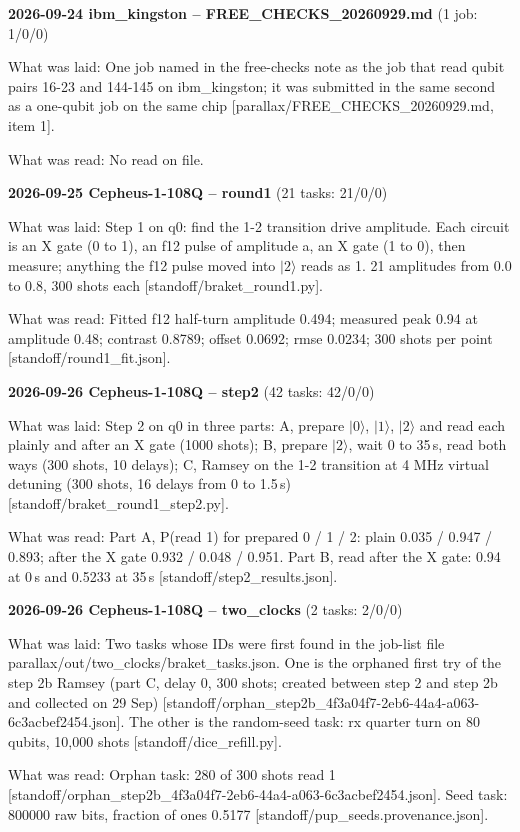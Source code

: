\documentclass[11pt]{article}
\begin{document}
\textbf{2026-09-24 ibm\_kingston -- FREE\_CHECKS\_20260929.md} (1 job: 1/0/0)

What was laid: One job named in the free-checks note as the job that read qubit pairs 16-23 and 144-145 on ibm\_kingston; it was submitted in the same second as a one-qubit job on the same chip {[}parallax/FREE\_CHECKS\_20260929.md, item 1{]}.

What was read: No read on file.

\textbf{2026-09-25 Cepheus-1-108Q -- round1} (21 tasks: 21/0/0)

What was laid: Step 1 on q0: find the 1-2 transition drive amplitude. Each circuit is an X gate (0 to 1), an f12 pulse of amplitude a, an X gate (1 to 0), then measure; anything the f12 pulse moved into \(|2\rangle\) reads as 1. 21 amplitudes from 0.0 to 0.8, 300 shots each {[}standoff/braket\_round1.py{]}.

What was read: Fitted f12 half-turn amplitude 0.494; measured peak 0.94 at amplitude 0.48; contrast 0.8789; offset 0.0692; rmse 0.0234; 300 shots per point {[}standoff/round1\_fit.json{]}.

\textbf{2026-09-26 Cepheus-1-108Q -- step2} (42 tasks: 42/0/0)

What was laid: Step 2 on q0 in three parts: A, prepare \(|0\rangle\), \(|1\rangle\), \(|2\rangle\) and read each plainly and after an X gate (1000 shots); B, prepare \(|2\rangle\), wait 0 to 35\,\textmu s, read both ways (300 shots, 10 delays); C, Ramsey on the 1-2 transition at 4 MHz virtual detuning (300 shots, 16 delays from 0 to 1.5\,\textmu s) {[}standoff/braket\_round1\_step2.py{]}.

What was read: Part A, P(read 1) for prepared 0 / 1 / 2: plain 0.035 / 0.947 / 0.893; after the X gate 0.932 / 0.048 / 0.951. Part B, read after the X gate: 0.94 at 0\,\textmu s and 0.5233 at 35\,\textmu s {[}standoff/step2\_results.json{]}.

\textbf{2026-09-26 Cepheus-1-108Q -- two\_clocks} (2 tasks: 2/0/0)

What was laid: Two tasks whose IDs were first found in the job-list file parallax/out/two\_clocks/braket\_tasks.json. One is the orphaned first try of the step 2b Ramsey (part C, delay 0, 300 shots; created between step 2 and step 2b and collected on 29 Sep) {[}standoff/orphan\_step2b\_4f3a04f7-2eb6-44a4-a063-6c3acbef2454.json{]}. The other is the random-seed task: rx quarter turn on 80 qubits, 10,000 shots {[}standoff/dice\_refill.py{]}.

What was read: Orphan task: 280 of 300 shots read 1 {[}standoff/orphan\_step2b\_4f3a04f7-2eb6-44a4-a063-6c3acbef2454.json{]}. Seed task: 800000 raw bits, fraction of ones 0.5177 {[}standoff/pup\_seeds.provenance.json{]}.
\end{document}
